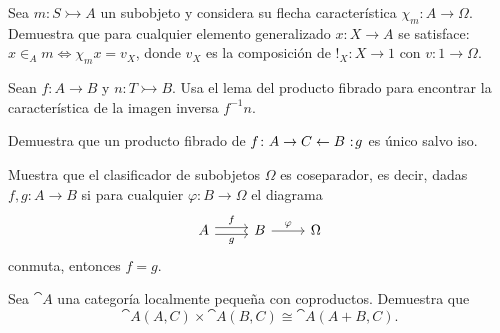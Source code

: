 \begin{exercise}[teca=1]
  Sea \(m\colon S\rightarrowtail A\) un subobjeto y considera su flecha
  característica \(\chi_m\colon A\to \Omega\). Demuestra que para
  cualquier elemento generalizado \(x\colon X\to A\) se satisface: \( x\in_A m \iff \chi_m x = v_X \), donde \(v_X\) es la composición de \(!_X\colon X\to 1\) con \(v\colon 1\to \Omega\).
\end{exercise}

\begin{exercise}
  Sean \(f\colon A\to B\) y \(n\colon T\rightarrowtail B\). Usa el lema
  del producto fibrado para encontrar la característica de la imagen
  inversa \(f^{-1}n\).
\end{exercise}


\begin{exercise}[par=2]
  Demuestra que un producto fibrado de \(f\colon A\to C\leftarrow B\noloc g\) es
  único salvo iso.
\end{exercise}

\begin{exercise}[par=2, teca=2]
  Muestra que el clasificador de subobjetos \(\Omega\) es coseparador, es
  decir, dadas \(f,g\colon A\to B\) si para cualquier 
  \(\varphi\colon B\to\Omega\) el diagrama
  \begin{equation*}
    \begin{tikzcd}[ampersand replacement=\&]
      A\ar[shift left]{r}{f}\ar[shift right]{r}[swap]{g}\& B\ar{r}{\varphi}\& \Omega      
    \end{tikzcd}
  \end{equation*}
  conmuta, entonces \(f = g\).
\end{exercise}

\begin{exercise}[par=2]
  Sea \(\cat{A}\) una categoría localmente pequeña con coproductos. Demuestra que
  \begin{equation*}
    \cat{A}(A,C)\times\cat{A}(B,C)\cong\cat{A}(A+B,C).
  \end{equation*}
\end{exercise}